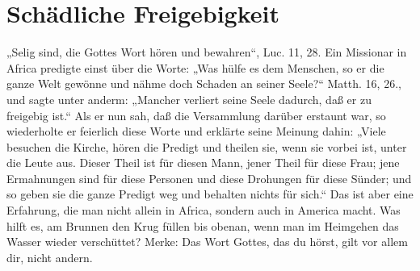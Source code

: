 \chapter{Schädliche Freigebigkeit}

„Selig sind, die Gottes Wort hören und bewahren“, Luc. 11, 28. Ein Missionar in Africa predigte einst über die Worte: „Was hülfe es dem Menschen, so er die ganze Welt gewönne und nähme doch Schaden an seiner Seele?“ Matth. 16, 26., und sagte unter anderm: „Mancher verliert seine Seele dadurch, daß er zu freigebig ist.“ Als er nun sah, daß die Versammlung darüber erstaunt war, so wiederholte er feierlich diese Worte und erklärte seine Meinung dahin: „Viele besuchen die Kirche, hören die Predigt und theilen sie, wenn sie vorbei ist, unter die Leute aus. Dieser Theil ist für diesen Mann, jener Theil für diese Frau; jene Ermahnungen sind für diese Personen und diese Drohungen für diese Sünder; und so geben sie die ganze Predigt weg und behalten nichts für sich.“ Das ist aber eine Erfahrung, die man nicht allein in Africa, sondern auch in America macht. Was hilft es, am Brunnen den Krug füllen bis obenan, wenn man im Heimgehen das Wasser wieder verschüttet? Merke: Das Wort Gottes, das du hörst, gilt vor allem dir, nicht andern.
